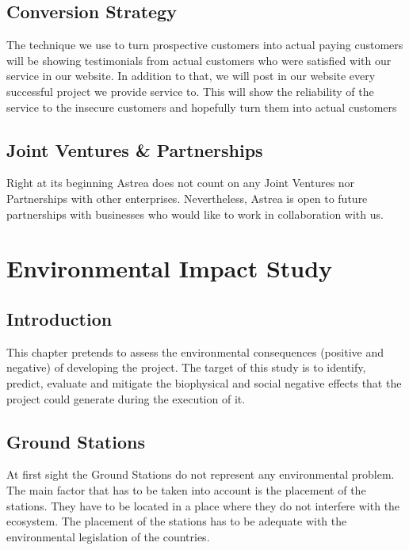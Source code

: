 \section{Conversion Strategy}
The technique we use to turn prospective customers into actual paying customers will be showing testimonials from actual customers who were satisfied with our service in our website. In addition to that, we will post in our website every successful project we provide service to. This will show the reliability of the service to the insecure customers and hopefully turn them into actual customers
\section{Joint Ventures \& Partnerships}
Right at its beginning Astrea does not count on any Joint Ventures nor Partnerships with other enterprises. Nevertheless, Astrea is open to future partnerships with businesses who would like to work in collaboration with us.




\chapter{Environmental Impact Study}
\section{Introduction}
This chapter pretends to assess the environmental consequences (positive and negative) of developing the project. The target of this study is to identify, predict, evaluate and mitigate the biophysical and social negative effects that the project could generate during the execution of it.
\section{Ground Stations}
At first sight the Ground Stations do not represent any environmental problem. The main factor that has to be taken into account is the placement of the stations. They have to be located in a place where they do not interfere with the ecosystem. The placement of the stations has to be adequate with the environmental legislation of the countries. 
